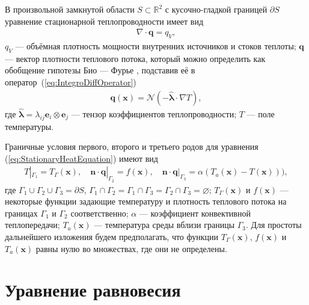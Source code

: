 В произвольной замкнутой области $S \subset \mathbb{R}^2$ с кусочно-гладкой границей $\partial S$ уравнение стационарной теплопроводности имеет вид \cite{MSS}
\begin{gather}
	\label{eq:StationaryHeatEquation}
	\nabla \cdot \boldsymbol{q} = q_V,
\end{gather}
$q_V$ --- объёмная плотность мощности внутренних источников и стоков теплоты;
$\boldsymbol{q}$ --- вектор плотности теплового потока, который можно определить как обобщение гипотезы Био --- Фурье \cite{ThermoViscoElasticity1, ThermoViscoElasticity2, ThermoViscoElasticity3}, подставив её в \mbox{оператор~(\ref{eq:IntegroDiffOperator})}
\begin{gather}
	\label{eq:BiotFourier}
	\boldsymbol{q}(\boldsymbol{x}) = 
	\mathcal{N} \left( -\widehat{\boldsymbol{\lambda}} \cdot \nabla T \right),
\end{gather}
где $\widehat{\boldsymbol{\lambda}} = \lambda_{ij} \boldsymbol{e}_i \otimes \boldsymbol{e}_j$ --- тензор коэффициентов теплопроводности;
$T$ --- поле температуры.

Граничные условия первого, второго и третьего родов для уравнения (\ref{eq:StationaryHeatEquation}) имеют вид
\begin{gather}
	\label{eq:ThermalBoundaries}
	T|_{\Gamma_1} = T_{\Gamma} (\boldsymbol{x}),
	\quad
	\boldsymbol{n} \cdot \boldsymbol{q}|_{\Gamma_2} = f(\boldsymbol{x}),
	\quad
	\boldsymbol{n} \cdot \boldsymbol{q}|_{\Gamma_3} = \alpha (T_a(\boldsymbol{x}) - T(\boldsymbol{x}))),
\end{gather}
где $\Gamma_1 \cup \Gamma_2 \cup \Gamma_3 = \partial S$, $\Gamma_1 \cap \Gamma_2 = \Gamma_1 \cap \Gamma_3 = \Gamma_2 \cap \Gamma_3 = \varnothing$;
$T_{\Gamma} (\boldsymbol{x})$ и $f(\boldsymbol{x})$ --- некоторые функции задающие температуру и плотность теплового потока на границах $\Gamma_1$ и $\Gamma_2$ соответственно;
$\alpha$ --- коэффициент конвективной теплопередачи;
$T_a (\boldsymbol{x})$ --- температура среды вблизи границы $\Gamma_3$.
Для простоты дальнейшего изложения будем предполагать, что функции $T_{\Gamma}(\boldsymbol{x})$, $f(\boldsymbol{x})$ и $T_a(\boldsymbol{x})$ равны нулю во множествах, где они не определены.

\section{Уравнение равновесия}\label{sec:BasicRelations/EquilibriumEquation}

